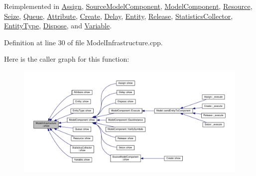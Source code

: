 Reimplemented in \hyperlink{class_assign_af5022b92204adcd9ee3e444b7e316d07}{Assign}, \hyperlink{class_source_model_component_a4011597b5780fcc0495e8e22ab8158f6}{Source\-Model\-Component}, \hyperlink{class_model_component_ad8bc846e36b028eab7efb7da6c549eca}{Model\-Component}, \hyperlink{class_resource_a593cf83404dc90706943b4e60213fd01}{Resource}, \hyperlink{class_seize_a495ace3a156680b5816c8b285135322c}{Seize}, \hyperlink{class_queue_ac78cc84cd91539c7f38d95dc17dabac5}{Queue}, \hyperlink{class_attribute_aa29f79466bd6ed5e36c402ec57cb2050}{Attribute}, \hyperlink{class_create_a8d1832d2165bbeea4a5a88aded883f86}{Create}, \hyperlink{class_delay_af8187e4515417b547dc22b5ee0a1f95d}{Delay}, \hyperlink{class_entity_a86cc324050b451b31b134943e7978e36}{Entity}, \hyperlink{class_release_a1ec7b35553820f0f228f31be1df468c3}{Release}, \hyperlink{class_statistics_collector_a7ce8dad7e29d06c73a01d2ddee93fe00}{Statistics\-Collector}, \hyperlink{class_entity_type_ab5a696912b12a9f51decded90f368dea}{Entity\-Type}, \hyperlink{class_dispose_aee8ef98d5ca22eb18a97b258ed059865}{Dispose}, and \hyperlink{class_variable_a8bd0a772bb32fd630e252306306cd154}{Variable}.



Definition at line 30 of file Model\-Infrastructure.\-cpp.



Here is the caller graph for this function\-:
\nopagebreak
\begin{figure}[H]
\begin{center}
\leavevmode
\includegraphics[width=350pt]{class_model_infrastructure_a649a5a89a0c9931783d3c51de2acf266_icgraph}
\end{center}
\end{figure}


